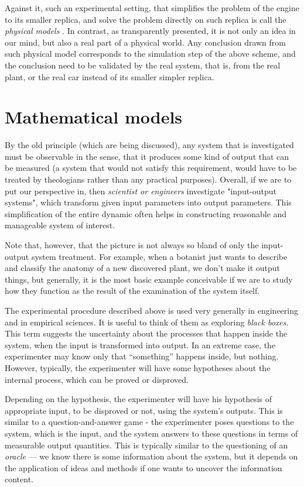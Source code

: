 Against it, such an experimental setting, that simplifies the problem of the engine to its smaller replica, and solve the problem directly on such replica is call the \textit{physical models} . In contrast, as transparently presented, it is not only an idea in our mind, but also a real part of a physical world.  Any conclusion drawn from such physical model corresponds to the simulation step of the above scheme, and the conclusion need to be validated by the real system, that is, from the real plant, or the real car instead of its smaller simpler replica. 

\section{Mathematical models}
By the old principle (which are being discussed), any system that is investigated must be observable in the sense, that it produces some kind of output that can be measured (a system that would not satisfy this requirement, would have to be treated by theologians rather than any practical purposes). Overall, if we are to put our perspective in, then \textit{scientist or engineers} investigate "input-output systems", which transform given input parameters into output parameters. This simplification of the entire dynamic often helps in constructing reasonable and manageable system of interest. 

Note that, however, that the picture is not always so bland of only the input-output system treatment. For example, when a botanist just wants to describe and classify the anatomy of a new discovered plant, we don't make it output things, but generally, it is the most basic example conceivable if we are to study how they function as the result of the examination of the system itself. 

The experimental procedure described above is used very generally in engineering and in empirical sciences. It is useful to think of them as exploring \textit{black boxes}. This term suggests the uncertainty about the processes that happen inside the system, when the input is transformed into output. In an extreme case, the experimenter may know only that “something” happens inside, but nothing. However, typically, the experimenter will have some hypotheses about the internal process, which can be proved or disproved. 

Depending on the hypothesis, the experimenter will have his hypothesis of appropriate input, to be disproved or not, using the system's outputs. This is similar to a question-and-answer game - the experimenter poses questions to the system, which is the input, and the system answers to these questions in terms of measurable output quantities. This is typically similar to the questioning of an \textit{oracle} --- we know there is some information about the system, but it depends on the application of ideas and methods if one wants to uncover the information content. 

